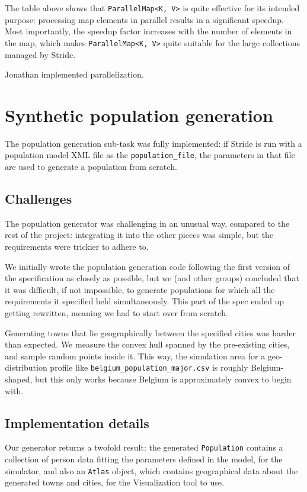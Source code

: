 \documentclass[a4paper,12pt]{article}
\newcommand{\typename}[2]{\texttt{#2}} %
\begin{document}
The table above shows that \typename{stride::util::parallel}{ParallelMap<K, V>} is quite effective for its intended purpose: processing map elements in parallel results in a significant speedup. Most importantly, the speedup factor increases with the number of elements in the map, which makes \typename{stride::util::parallel}{ParallelMap<K, V>} quite suitable for the large collections managed by Stride.

Jonathan implemented parallelization.

\section{Synthetic population generation}
The population generation sub-task was fully implemented: if Stride is run with a population model XML file as the \texttt{population\_file}, the parameters in that file are used to generate a population from scratch.

\subsection{Challenges}
The population generator was challenging in an unusual way, compared to the rest of the project: integrating it into the other pieces was simple, but the requirements were trickier to adhere to.

We initially wrote the population generation code following the first version of the specification as closely as possible, but we (and other groups) concluded that it was difficult, if not impossible, to generate populations for which all the requirements it specified held simultaneously. This part of the spec ended up getting rewritten, meaning we had to start over from scratch.

Generating towns that lie geographically between the specified cities was harder than expected. We measure the convex hull spanned by the pre-existing cities, and sample random points inside it. This way, the simulation area for a geo-distribution profile like \texttt{belgium\_population\_major.csv} is roughly Belgium-shaped, but this only works because Belgium is approximately convex to begin with.

\subsection{Implementation details}
Our generator returns a twofold result: the generated \texttt{Population} contains a collection of person data fitting the parameters defined in the model, for the simulator, and also an \texttt{Atlas} object, which contains geographical data about the generated towns and cities, for the Visualization tool to use.
\end{document}

